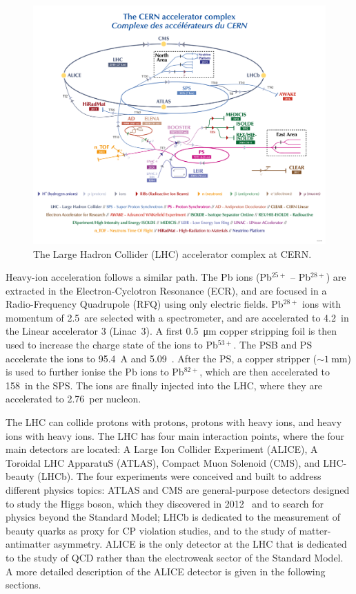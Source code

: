 \begin{figure}[htb]
    \centering
    \includegraphics[width=\textwidth]{Figures/Chapter 3/LHC_Scheme.png}
    \caption{The Large Hadron Collider (LHC) accelerator complex at CERN.}
    \label{fig:LHC}
\end{figure}

Heavy-ion acceleration follows a similar path. The Pb ions (Pb$^{25+}$ -- Pb$^{28+}$) are extracted in the Electron-Cyclotron Resonance (ECR), and are focused in a Radio-Frequency Quadrupole (RFQ) using only electric fields. Pb$^{28+}$ ions with momentum of 2.5~\kevc are selected with a spectrometer, and are accelerated to 4.2~\mevc in the Linear accelerator 3 (Linac~3). A first \SI{0.5}{\micro\meter} copper stripping foil is then used to increase the charge state of the ions to Pb$^{53+}$. The PSB and PS accelerate the ions to 95.4~\mev A and 5.09~\gev. After the PS, a copper stripper ($\sim 1~\mathrm{mm}$) is used to further ionise the Pb ions to Pb$^{82+}$, which are then accelerated to 158~\gev in the SPS. The ions are finally injected into the LHC, where they are accelerated to 2.76~\tev per nucleon.

The LHC can collide protons with protons, protons with heavy ions, and heavy ions with heavy ions. The LHC has four main interaction points, where the four main detectors are located: A Large Ion Collider Experiment (ALICE), A Toroidal LHC ApparatuS (ATLAS), Compact Muon Solenoid (CMS), and LHC-beauty (LHCb). The four experiments were conceived and built to address different physics topics: ATLAS and CMS are general-purpose detectors designed to study the Higgs boson, which they discovered in 2012~\cite{ATLAS:2012yve,CMS:2012qbp} and to search for physics beyond the Standard Model; LHCb is dedicated to the measurement of beauty quarks as proxy for CP violation studies, and to the study of matter-antimatter asymmetry. ALICE is the only detector at the LHC that is dedicated to the study of QCD rather than the electroweak sector of the Standard Model. A more detailed description of the ALICE detector is given in the following sections.

